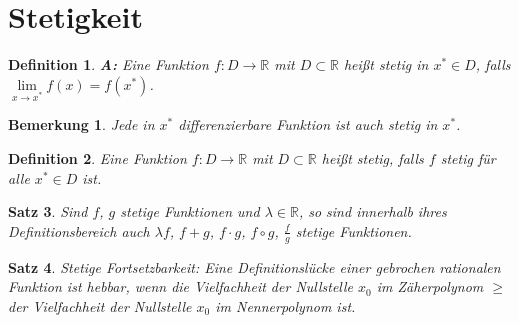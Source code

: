\documentclass[12pt,a4paper]{article}%
\newtheorem{satz}{Satz}[section]
\newtheorem{definition}[satz]{Definition}
\newtheorem{bem}{Bemerkung}[section]
\numberwithin{equation}{section}
\newcommand{\R}{\mathbb{R}} %
\numberwithin{equation}{subsection}
\begin{document}
\section{Stetigkeit}
  \begin{definition}
    \textbf{A:} \newline Eine Funktion $f:D\rightarrow \R$ mit $D \subset \R$ heißt stetig in $x^* \in D$, falls $\lim\limits_{x \rightarrow x^*} f(x) = f(x^*)$. \label{def:stet_a}
  \end{definition}
  \begin{bem}
    Jede in $x^*$ differenzierbare Funktion ist auch stetig in $x^*$.
  \end{bem}
  \begin{definition}
    Eine Funktion $f:D\rightarrow \R$ mit $D \subset \R$ heißt stetig, falls $f$ stetig für alle $x^* \in D$ ist.
  \end{definition}
  \begin{satz}
    Sind $f$, $g$ stetige Funktionen und $\lambda \in \R$, so sind innerhalb ihres Definitionsbereich auch $\lambda f$, $f+g$, $f\cdot g$, $f\circ g$, $\frac{f}{g}$ stetige Funktionen.
  \end{satz}
  \begin{satz}
  Stetige Fortsetzbarkeit: Eine Definitionslücke einer gebrochen rationalen Funktion ist hebbar, wenn die Vielfachheit der Nullstelle $x_0$ im Zäherpolynom $\geq$ der Vielfachheit der Nullstelle $x_0$ im Nennerpolynom ist.
  \end{satz}
\end{document}
